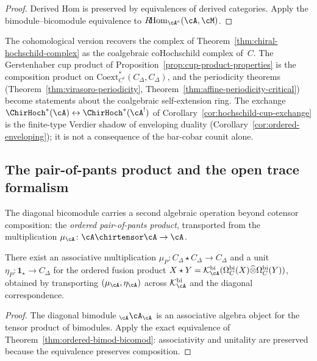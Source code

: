 \begin{proof}
Derived Hom is preserved by equivalences of derived categories.
Apply the bimodule--bicomodule equivalence to
$R\!\mathrm{Hom}_{\cA^e}(\cA, \cM)$.
\end{proof}

\begin{remark}
\label{rem:ordered-HH-relation}
The cohomological version recovers the complex of
Theorem~\ref{thm:chiral-hochschild-complex} as the coalgebraic
coHochschild complex of~$C$. The Gerstenhaber cup product of
Proposition~\ref{prop:cup-product-properties} is the composition
product on $\mathrm{Coext}_{C^e}^*(C_\Delta, C_\Delta)$, and the
periodicity theorems
(Theorem~\ref{thm:virasoro-periodicity},
Theorem~\ref{thm:affine-periodicity-critical}) become statements
about the coalgebraic self-extension ring. The exchange
$\ChirHoch^*(\cA) \leftrightarrow \ChirHoch^*(\cA^!)$ of
Corollary~\ref{cor:hochschild-cup-exchange} is the finite-type
Verdier shadow of enveloping duality
(Corollary~\ref{cor:ordered-enveloping}); it is not a consequence of
the bar-cobar counit alone.
\end{remark}

\subsection{The pair-of-pants product and the open trace formalism}

The diagonal bicomodule carries a second algebraic operation beyond
cotensor composition: the \emph{ordered pair-of-pants product},
transported from the multiplication
$\mu_\cA \colon \cA \chirtensor \cA \to \cA$.

\begin{theorem}
\label{thm:ordered-pair-of-pants}
There exist an associative multiplication
$\mu_P \colon C_\Delta \star C_\Delta \to C_\Delta$
and a unit
$\eta_P \colon \mathbf{1}_\star \to C_\Delta$
for the ordered fusion product
$X \star Y = \mathcal{K}_\cA^{\mathrm{bi}}(
\Omega_C^{\mathrm{bi}}(X) \widehat\otimes
\Omega_C^{\mathrm{bi}}(Y))$,
obtained by transporting $(\mu_\cA, \eta_\cA)$ across
$\mathcal{K}_\cA^{\mathrm{bi}}$ and the diagonal correspondence.
\end{theorem}

\begin{proof}
The diagonal bimodule ${}_\cA \cA_\cA$ is an associative algebra
object for the tensor product of bimodules. Apply the exact
equivalence of
Theorem~\ref{thm:ordered-bimod-bicomod}: associativity and
unitality are preserved because the equivalence preserves
composition.
\end{proof}

